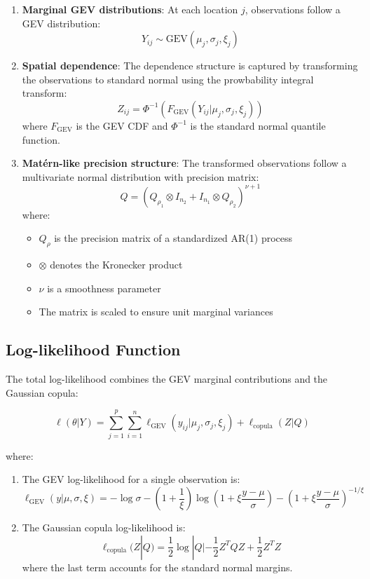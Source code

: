 \documentclass[
  letterpaper,
  DIV=11,
  numbers=noendperiod]{scrartcl}
\providecommand{\tightlist}{%
  \setlength{\itemsep}{0pt}\setlength{\parskip}{0pt}}\usepackage{longtable,booktabs,array}
\begin{document}
\begin{enumerate}
\def\labelenumi{\arabic{enumi}.}
\item
  \textbf{Marginal GEV distributions}: At each location \(j\),
  observations follow a GEV distribution:
  \[Y_{ij} \sim \text{GEV}(\mu_j, \sigma_j, \xi_j)\]
\item
  \textbf{Spatial dependence}: The dependence structure is captured by
  transforming the observations to standard normal using the
  prowbability integral transform:
  \[Z_{ij} = \Phi^{-1}(F_{\text{GEV}}(Y_{ij}|\mu_j,\sigma_j,\xi_j))\]
  where \(F_{\text{GEV}}\) is the GEV CDF and \(\Phi^{-1}\) is the
  standard normal quantile function.
\item
  \textbf{Matérn-like precision structure}: The transformed observations
  follow a multivariate normal distribution with precision matrix:
  \[Q = (Q_{\rho_1} \otimes I_{n_2} + I_{n_1} \otimes Q_{\rho_2})^{\nu+1}\]
  where:

  \begin{itemize}
  \tightlist
  \item
    \(Q_{\rho}\) is the precision matrix of a standardized AR(1) process
  \item
    \(\otimes\) denotes the Kronecker product
  \item
    \(\nu\) is a smoothness parameter
  \item
    The matrix is scaled to ensure unit marginal variances
  \end{itemize}
\end{enumerate}

\subsection{Log-likelihood Function}\label{log-likelihood-function}

The total log-likelihood combines the GEV marginal contributions and the
Gaussian copula:

\[\ell(\theta|Y) = \sum_{j=1}^p \sum_{i=1}^n \ell_{\text{GEV}}(y_{ij}|\mu_j,\sigma_j,\xi_j) + \ell_{\text{copula}}(Z|Q)\]

where:

\begin{enumerate}
\def\labelenumi{\arabic{enumi}.}
\item
  The GEV log-likelihood for a single observation is:
  \[\ell_{\text{GEV}}(y|\mu,\sigma,\xi) = -\log\sigma - (1+\frac{1}{\xi})\log(1+\xi\frac{y-\mu}{\sigma}) - (1+\xi\frac{y-\mu}{\sigma})^{-1/\xi}\]
\item
  The Gaussian copula log-likelihood is:
  \[\ell_{\text{copula}}(Z|Q) = \frac{1}{2}\log|Q| - \frac{1}{2}Z^TQZ + \frac{1}{2}Z^TZ\]
  where the last term accounts for the standard normal margins.
\end{enumerate}
\end{document}
